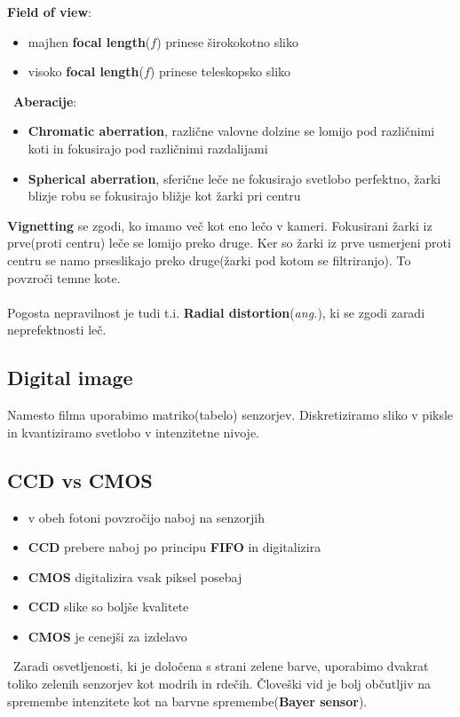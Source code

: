 \documentclass[11pt]{article}
\begin{document}
\textbf{Field of view}:
\begin{itemize}
\item majhen \textbf{focal length}($f$) prinese \v{s}irokokotno sliko
\item visoko \textbf{focal length}($f$) prinese teleskopsko sliko
\end{itemize}
\
\textbf{Aberacije}:
\begin{itemize}
\item \textbf{Chromatic aberration}, razli\v{c}ne valovne dolzine se lomijo pod razli\v{c}nimi koti in fokusirajo pod razli\v{c}nimi razdalijami
\item \textbf{Spherical aberration}, sferi\v{c}ne le\v{c}e ne fokusirajo svetlobo perfektno, \v{z}arki blizje robu se fokusirajo bli\v{z}je kot \v{z}arki pri centru
\end{itemize}

\newpage

\textbf{Vignetting} se zgodi, ko imamo ve\v{c} kot eno le\v{c}o v kameri. Fokusirani \v{z}arki iz prve(proti centru) le\v{c}e se lomijo preko druge. Ker so \v{z}arki iz prve usmerjeni proti centru se namo prseslikajo preko druge(\v{z}arki pod kotom se filtriranjo). To povzro\v{c}i temne kote.\\
\\
Pogosta nepravilnost je tudi t.i. \textbf{Radial distortion}(\textit{ang.}), ki se zgodi zaradi neprefektnosti le\v{c}.

\subsection{Digital image}
Namesto filma uporabimo matriko(tabelo) senzorjev. Diskretiziramo sliko v piksle in kvantiziramo svetlobo v intenzitetne nivoje.

\subsection{CCD vs CMOS}
\begin{itemize}
\item v obeh fotoni povzro\v{c}ijo naboj na senzorjih
\item \textbf{CCD} prebere naboj po principu \textbf{FIFO} in digitalizira
\item \textbf{CMOS} digitalizira vsak piksel posebaj
\item \textbf{CCD} slike so bolj\v{s}e kvalitete
\item \textbf{CMOS} je cenej\v{s}i za izdelavo
\end{itemize}
\
Zaradi osvetljenosti, ki je dolo\v{c}ena s strani zelene barve, uporabimo dvakrat toliko zelenih senzorjev kot modrih in rde\v{c}ih. \v{C}love\v{s}ki vid je bolj ob\v{c}utljiv na spremembe intenzitete kot na barvne spremembe(\textbf{Bayer sensor}).
\end{document}

